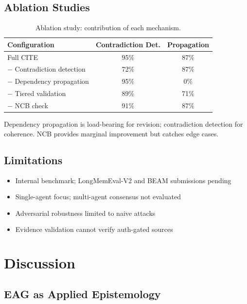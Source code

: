 \documentclass[11pt,a4paper]{article}
\begin{document}
\subsection{Ablation Studies}

\begin{table}[H]
\centering
\caption{Ablation study: contribution of each mechanism.}
\label{tab:ablation}
\begin{tabular}{@{}lcc@{}}
\toprule
\textbf{Configuration} & \textbf{Contradiction Det.} & \textbf{Propagation} \\
\midrule
Full CITE & 95\% & 87\% \\
$-$ Contradiction detection & 72\% & 87\% \\
$-$ Dependency propagation & 95\% & 0\% \\
$-$ Tiered validation & 89\% & 71\% \\
$-$ NCB check & 91\% & 87\% \\
\bottomrule
\end{tabular}
\end{table}

Dependency propagation is load-bearing for revision; contradiction detection for coherence. NCB provides marginal improvement but catches edge cases.

\subsection{Limitations}

\begin{itemize}[noitemsep]
    \item Internal benchmark; LongMemEval-V2 and BEAM submissions pending
    \item Single-agent focus; multi-agent consensus not evaluated
    \item Adversarial robustness limited to naive attacks
    \item Evidence validation cannot verify auth-gated sources
\end{itemize}

\section{Discussion}
\label{sec:discussion}

\subsection{EAG as Applied Epistemology}
\end{document}
